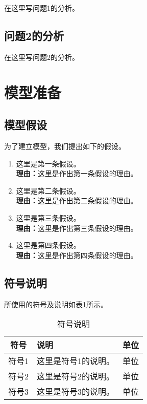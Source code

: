 \documentclass[12pt, a4paper, oneside, utf8]{ctexart}
\begin{document}
    在这里写问题1的分析。

    \subsection{问题2的分析}

    在这里写问题2的分析。

    \section{模型准备}

    \subsection{模型假设}

    为了建立模型，我们提出如下的假设。

    \begin{enumerate}
        \item 这里是第一条假设。
        \\\textbf{理由：}这里是作出第一条假设的理由。
        \item 这里是第二条假设。
        \\\textbf{理由：}这里是作出第二条假设的理由。
        \item 这里是第三条假设。
        \\\textbf{理由：}这里是作出第三条假设的理由。
        \item 这里是第四条假设。
        \\\textbf{理由：}这里是作出第四条假设的理由。
    \end{enumerate}

    \subsection{符号说明}

    所使用的符号及说明如表\ref{table1}所示。

    \begin{table}[ht]
        \caption{符号说明}\label{table1}
        \centering
        \begin{tabular}{c l c}
            \hline
            \textbf{符号} & \textbf{说明}        & \textbf{单位}   \\ \hline
            符号1         & 这里是符号1的说明。  & 单位             \\
            符号2         & 这里是符号2的说明。  & 单位             \\
            符号3         & 这里是符号3的说明。  & 单位             \\ \hline
        \end{tabular}
    \end{table}
\end{document}
